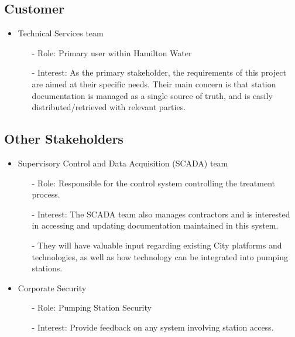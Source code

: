 \documentclass[12pt]{article}
\begin{document}
\subsection{Customer}

\begin{itemize}
  \item Technical Services team
    \begin{itemize}
      \item[-] Role: Primary user within Hamilton Water
      \item[-] Interest: As the primary stakeholder, the requirements
        of this project are aimed at their specific needs. Their main concern
        is that station documentation is managed as a single source of truth,
        and is easily distributed/retrieved with relevant parties.
    \end{itemize}
\end{itemize}
\subsection{Other Stakeholders}

\begin{itemize}
  \item Supervisory Control and Data Acquisition (SCADA) team
    \begin{itemize}
      \item[-] Role: Responsible for the control system controlling
        the treatment process.
      \item[-] Interest: The SCADA team also manages contractors and is
        interested in accessing and updating documentation maintained
        in this system.
      \item[-] They will have valuable input regarding existing City
        platforms and technologies, as well as how technology can be
        integrated into pumping stations.
    \end{itemize}
  \item Corporate Security

    \begin{itemize}
      \item[-] Role: Pumping Station Security
      \item[-] Interest: Provide feedback on any system involving station
        access.
    \end{itemize}
\end{itemize}
\end{document}
